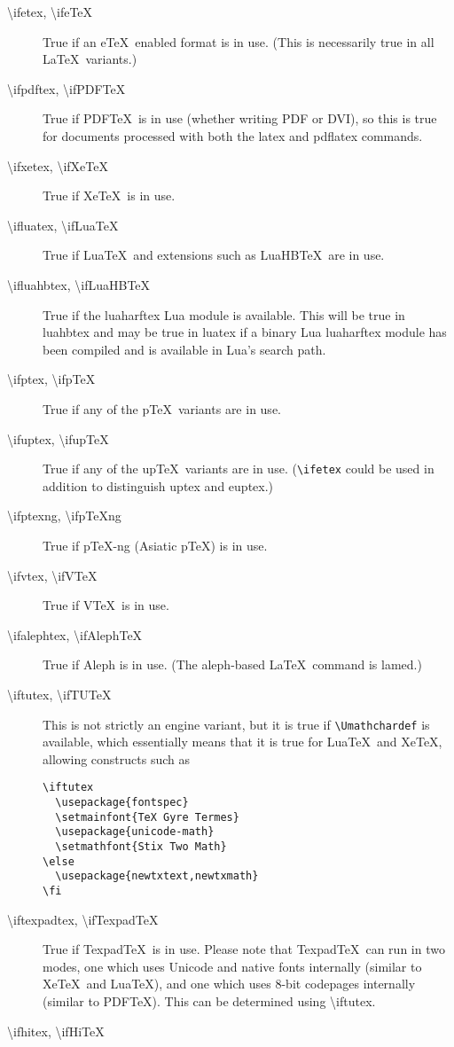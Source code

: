\documentclass{article}
\newcommand\cs[1]{{\ttfamily\textbackslash #1}}
\begin{document}
\begin{description}
\item[\cs{ifetex},      \cs{ifeTeX}]
True if an e\TeX\ enabled format is in use. (This is necessarily true
in all \LaTeX\ variants.)
\item[\cs{ifpdftex},    \cs{ifPDFTeX}]
True if PDF\TeX\ is in use (whether writing PDF or DVI), so this is
true for documents processed with both the  \textsf{latex} and
\textsf{pdflatex} commands.
\item[\cs{ifxetex},     \cs{ifXeTeX}]
True if Xe\TeX\ is in use.
\item[\cs{ifluatex},    \cs{ifLuaTeX}]
True if Lua\TeX\ and extensions such as LuaHB\TeX\ are in use.
\item[\cs{ifluahbtex},  \cs{ifLuaHBTeX}]
True if the \textsf{luaharftex} Lua module is available.
This will be true in \textsf{luahbtex} and may be true in
\textsf{luatex} if a binary Lua \textsf{luaharftex} module has been
compiled and is available in Lua's search path.
\item[\cs{ifptex},      \cs{ifpTeX}]
True if any of the p\TeX\ variants are in use.
\item[\cs{ifuptex},     \cs{ifupTeX}]
True if any of the up\TeX\ variants are in use. (\verb|\ifetex| could
be used in addition to distinguish \textsf{uptex} and \textsf{euptex}.)
\item[\cs{ifptexng},    \cs{ifpTeXng}]
True if p\TeX-ng (Asiatic p\TeX) is in use.
\item[\cs{ifvtex},      \cs{ifVTeX}]
True if V\TeX\ is in use.
\item[\cs{ifalephtex},  \cs{ifAlephTeX}]
True if Aleph is in use. (The \textsf{aleph}-based \LaTeX\ command is
\textsf{lamed}.)
\item[\cs{iftutex},     \cs{ifTUTeX}]
This is not strictly an engine variant, but it is true if
\verb|\Umathchardef| is available, which essentially means that it is
true for Lua\TeX\ and Xe\TeX, allowing constructs such as
\begin{verbatim}
\iftutex
  \usepackage{fontspec}
  \setmainfont{TeX Gyre Termes}
  \usepackage{unicode-math}
  \setmathfont{Stix Two Math}
\else
  \usepackage{newtxtext,newtxmath}
\fi
\end{verbatim}
\item[\cs{iftexpadtex}, \cs{ifTexpadTeX}]
True if Texpad\TeX\ is in use. Please note that Texpad\TeX\ can run in two
modes, one which uses Unicode and native fonts internally (similar to
Xe\TeX\ and Lua\TeX), and one which uses 8-bit codepages internally (similar to
PDF\TeX). This can be determined using \cs{iftutex}.
\item[\cs{ifhitex}, \cs{ifHiTeX}]
\end{description}
\end{document}
